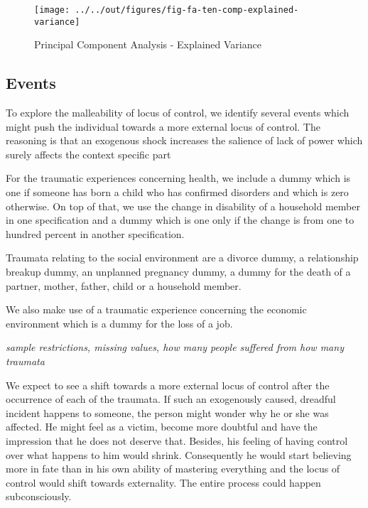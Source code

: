 \documentclass[12pt, a4paper, fleqn, parskip]{scrartcl}
\begin{document}
\begin{figure}[ht!]
	\centering
	\texttt{[image: ../../out/figures/fig-fa-ten-comp-explained-variance]}
	\caption{Principal Component Analysis - Explained Variance}
	\label{fig:pca_ev}
\end{figure}



\subsection{Events} %
\label{sub:events}

To explore the malleability of locus of control, we identify several events
which might push the individual towards a more external locus of control. The
reasoning is that an exogenous shock increases the salience of lack of power
which surely affects the context specific part


For the traumatic experiences concerning health, we include a dummy which is
one if someone has born a child who has confirmed disorders and which is zero
otherwise. On top of that, we use the change in disability of a household
member in one specification and a dummy which is one only if the change is from
one to hundred percent in another specification.

Traumata relating to the social environment are a divorce dummy, a relationship
breakup dummy, an unplanned pregnancy dummy, a dummy for the death of a
partner, mother, father, child or a household member.

We also make use of a traumatic experience concerning the economic environment
which is a dummy for the loss of a job.

\textit{sample restrictions, missing values, how many people suffered from how
many traumata}

We expect to see a shift towards a more external locus of control after the
occurrence of each of the traumata. If such an exogenously caused, dreadful
incident happens to someone, the person might wonder why he or she was
affected. He might feel as a victim, become more doubtful and have the
impression that he does not deserve that. Besides, his feeling of having
control over what happens to him would shrink. Consequently he would start
believing more in fate than in his own ability of mastering everything and the
locus of control would shift towards externality. The entire process could
happen subconsciously.
\end{document}
